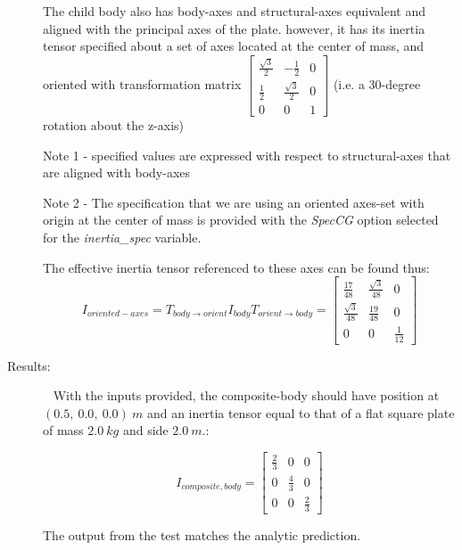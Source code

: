 \begin{description}
The child body also has body-axes and structural-axes equivalent and aligned 
with the principal axes of the plate.  however, it has its inertia tensor 
specified about a set of axes located at 
the center of mass, and oriented with transformation 
matrix 
$\begin{bmatrix} \frac{\sqrt{3}}{2} & -\frac{1}{2}   & 0  \\
                   \frac{1}{2}   & \frac{\sqrt{3}}{2} & 0   \\
                    0  & 0   & 1 
   \end{bmatrix}
$
(i.e. a 30-degree rotation about the z-axis)

Note 1 - specified values are expressed with respect to structural-axes that 
are aligned with body-axes  

Note 2 - The specification that we are using an oriented axes-set with origin 
at the center of mass is provided with the \textit{SpecCG} option selected for 
the \textit{inertia\_spec} variable.

The effective inertia tensor referenced to these axes can be found thus:
\begin{equation*}
I_{oriented-axes} = T_{body \rightarrow orient} I_{body} T_{orient \rightarrow 
body} = 
   \begin{bmatrix} \frac{17}{48} & \frac{\sqrt{3}}{48}   & 0  \\
                   \frac{\sqrt{3}}{48}   & \frac{19}{48} & 0   \\
                    0  & 0  & \frac{1}{12} 
   \end{bmatrix}
\end{equation*}

\item[Results:]\ \newline
With the inputs provided, the composite-body should have position at $(0.5, 
~0.0, ~0.0)~m$ and an inertia tensor equal to that of a flat square plate of 
mass $2.0 ~kg$ and side $2.0 ~m$.:

\begin{equation*}
I_{composite, body} = 
   \begin{bmatrix} \frac{2}{3} & 0 & 0  \\
                   0   & \frac{4}{3} & 0   \\
                    0  & 0  & \frac{2}{3} 
   \end{bmatrix}
\end{equation*}

The output from the test matches the analytic prediction.
\end{description}

















